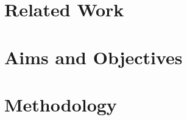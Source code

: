 \documentclass[
11pt, %
oneside, %
english, %
onehalfspacing,%
headsepline, %
]{MastersDoctoralThesis} %
\begin{document}
\chapter{Related Work}

\chapter{Aims and Objectives}

\chapter{Methodology}


\printbibliography\
\end{document}
